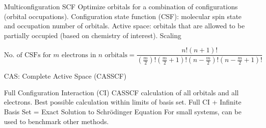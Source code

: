 \documentclass[aspectratio=169]{beamer}
\begin{document}
    \begin{frame}{Multiconfiguration SCF}
        Optimize orbitals for a combination of configurations (orbital occupations).\newline
        \newline
        Configuration state function (CSF): molecular spin state and occupation number of orbitals.\newline
        \newline
        Active space: orbitals that are allowed to be partially occupied (based on chemistry of interest).\newline
        \newline
        Scaling

        \begin{equation*}
            \mbox{No. of CSFs for $m$ electrons in $n$ orbitals} = \frac{n!(n+1)!}{(\frac{m}{2})!(\frac{m}{2}+1)!(n-\frac{m}{2})!(n-\frac{m}{2}+1)!}
        \end{equation*}

        CAS: Complete Active Space (CASSCF)

    \end{frame}

    \begin{frame}{Full Configuration Interaction (CI)}
        CASSCF calculation of all orbitals and all electrons.\newline
        \newline
        Best possible calculation within limits of basis set.\newline
        \newline
        Full CI + Infinite Basis Set = Exact Solution to Schr\"odinger Equation\newline
        \newline
        For small systems, can be used to benchmark other methods.

    \end{frame}
\end{document}
